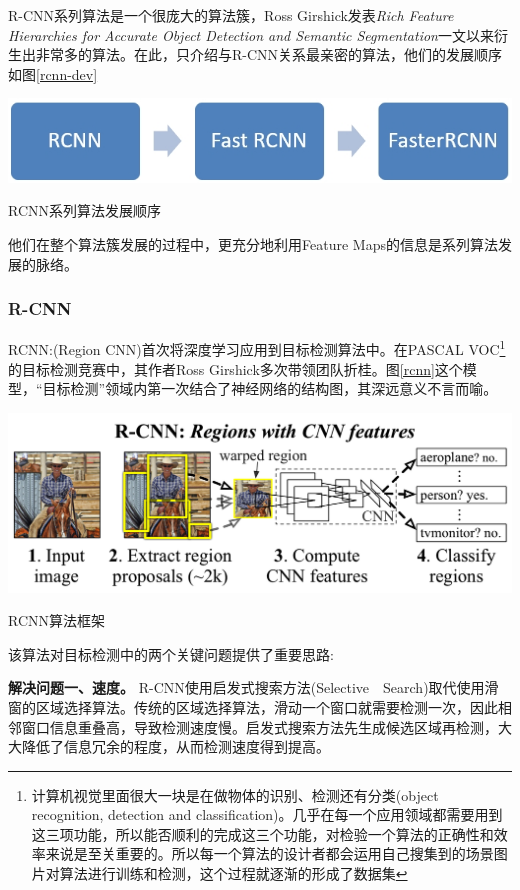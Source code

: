 R-CNN系列算法是一个很庞大的算法簇，Ross Girshick发表\textit{Rich Feature Hierarchies for Accurate Object Detection and Semantic Segmentation}\cite{rcnn}一文以来衍生出非常多的算法。在此，只介绍与R-CNN关系最亲密的算法，他们的发展顺序如图\ref{rcnn-dev}
\begin{uscfigure}
	\includegraphics[width=\textwidth]{./Pictures/rcnn.jpg}	
	\caption{RCNN系列算法发展顺序}
	\label{rcnn-dev}
\end{uscfigure}

\par \noindent
他们在整个算法簇发展的过程中，更充分地利用Feature Maps的信息是系列算法发展的脉络。
\subsubsection{R-CNN}
RCNN:(Region CNN)\cite{rcnn}首次将深度学习应用到目标检测算法中。在PASCAL VOC\footnote{计算机视觉里面很大一块是在做物体的识别、检测还有分类(object recognition, detection and classification)。几乎在每一个应用领域都需要用到这三项功能，所以能否顺利的完成这三个功能，对检验一个算法的正确性和效率来说是至关重要的。所以每一个算法的设计者都会运用自己搜集到的场景图片对算法进行训练和检测，这个过程就逐渐的形成了数据集}的目标检测竞赛中，其作者Ross Girshick多次带领团队折桂。图\ref{rcnn}这个模型，“目标检测”领域内第一次结合了神经网络的结构图，其深远意义不言而喻。
\begin{uscfigure}
	\includegraphics[width=\textwidth]{./Pictures/rcnn-regions_with_cnn_features.png}	
	\caption{RCNN算法框架}
	\label{rcnn}
\end{uscfigure}
该算法对目标检测中的两个关键问题提供了重要思路:

\textbf{解决问题一、速度。}
R-CNN使用启发式搜索方法(Selective　Search\cite{ss})取代使用滑窗的区域选择算法。传统的区域选择算法，滑动一个窗口就需要检测一次，因此相邻窗口信息重叠高，导致检测速度慢。启发式搜索方法先生成候选区域再检测，大大降低了信息冗余的程度，从而检测速度得到提高。

